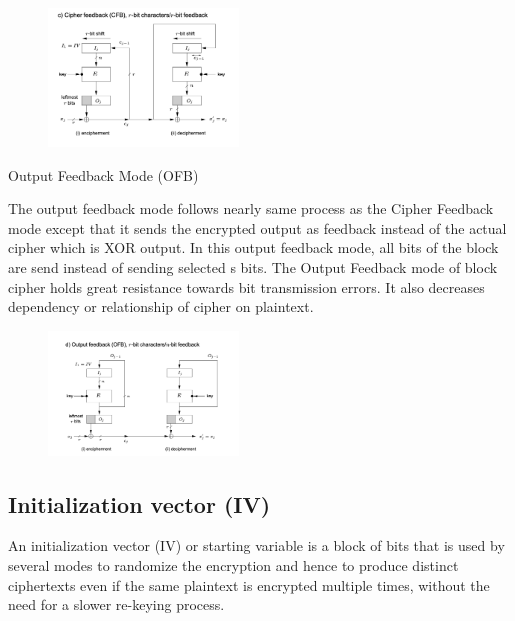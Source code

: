 \documentclass[fleqn, journal, onecolumn]{IEEEtran}             %
\theoremstyle{break}                                            %
\begin{document}
        \begin{figure}[!htbp] 
          \includegraphics[width=0.45\textwidth]{CFB}
          \caption{\cite{Meneces}}
        \end{figure}


      Output Feedback Mode (OFB) 
      
        The output feedback mode follows nearly same process as the Cipher Feedback mode except that it sends
        the encrypted output as feedback instead of the actual cipher which is XOR output. In this output feedback
        mode, all bits of the block are send instead of sending selected s bits. The Output Feedback mode of block
        cipher holds great resistance towards bit transmission errors. It also decreases dependency or relationship
        of cipher on plaintext.

        \begin{figure}[!htbp] 
          \includegraphics[width=0.45\textwidth]{OFB}
          \caption{\cite{Meneces}}
        \end{figure}


    \cite{GOG}

    \subsection{Initialization vector (IV)}

      An initialization vector (IV) or starting variable is a block of bits that is used by several modes to
      randomize the encryption and hence to produce distinct ciphertexts even if the same plaintext is
      encrypted multiple times, without the need for a slower re-keying process.
\end{document}
